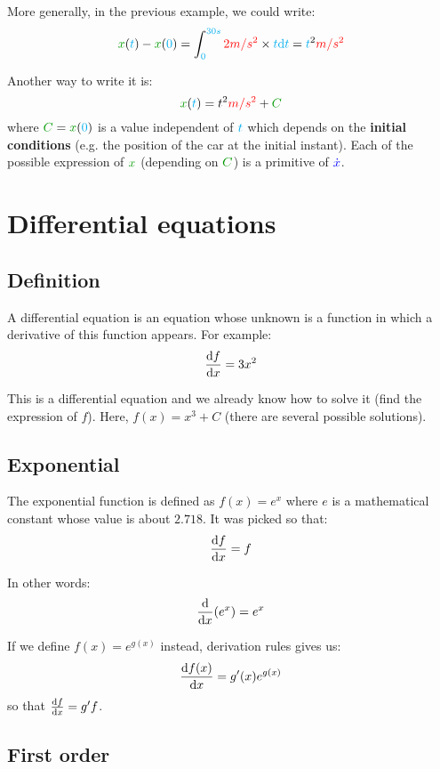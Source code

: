 More generally, in the previous example, we could write:
\[
\dist{x}(\delay{t}) - \dist{x}(\delay{0})
= \int_{\delay{0}}^{\delay{30s}} \accel{2m/s^2} \times \delay{t} \delay{\dt}
= \delay{t}^2 \accel{m/s^2}
\]

Another way to write it is:
\[
\dist{x}(\delay{t})
= t^2 \accel{m/s^2} + \dist{C}
\]
where $\dist{C} = \dist{x}(\delay{0})$ is a value independent of
$\textcolor{cyan}{t}$ which depends on the \textbf{initial conditions} (e.g. the
position of the car at the initial instant). Each of the possible
expression of $\dist{x}$ (depending on $\dist{C}$) is a primitive of
$\textcolor{blue}{\dot x}$.



\section{Differential equations}


\subsection{Definition}

A differential equation is an equation whose unknown is a function in
which a derivative of this function appears. For example:
\[
\frac {\mathrm{d} f} {\mathrm{d} x} = 3x^2
\]

This is a differential equation and we already know how to solve it
(find the expression of $f$). Here, $f(x) = x^3 + C$ (there are several
possible solutions).


\subsection{Exponential}

The exponential function is defined as $f(x) = e^x$ where $e$ is a
mathematical constant whose value is about $2.718$. It was picked so that:
\[
\frac {\mathrm{d} f} {\mathrm{d} x} = f
\]

In other words:
\[
\frac {\mathrm{d}} {\mathrm{d} x} (e^x) = e^x
\]

\begin{remark}
If we define $f(x) = e^{g(x)}$ instead, derivation rules
gives us:
\[
\frac {\mathrm{d} f(x)} {\mathrm{d} x}
= g'(x) e^{g(x)}
\]
so that $\frac {\mathrm{d} f} {\mathrm{d} x} = g' f$.
\end{remark}


\subsection{First order}

